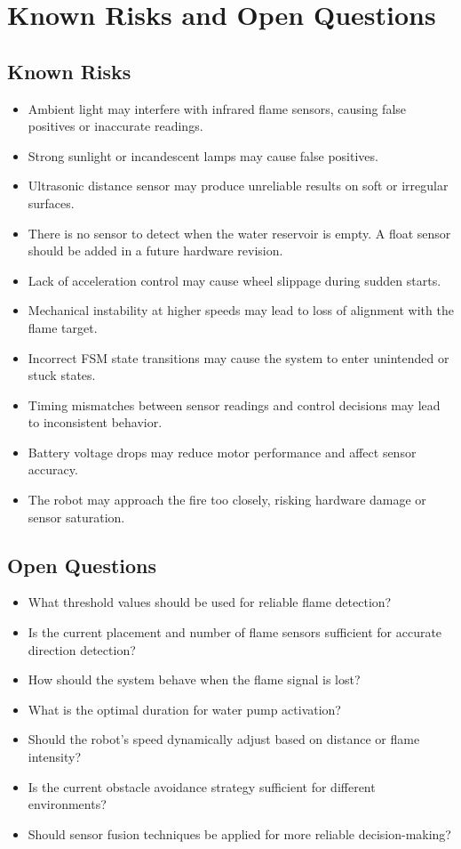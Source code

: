 \documentclass[12pt]{article}
\begin{document}
\section{Known Risks and Open Questions}

\subsection{Known Risks}
\begin{itemize}
    \item Ambient light may interfere with infrared flame sensors, causing false positives or inaccurate readings.
    \item Strong sunlight or incandescent lamps may cause false positives.
    \item Ultrasonic distance sensor may produce unreliable results on soft or irregular surfaces.
    \item There is no sensor to detect when the water reservoir is empty. A float sensor should be added in a future hardware revision.
    \item Lack of acceleration control may cause wheel slippage during sudden starts.
    \item Mechanical instability at higher speeds may lead to loss of alignment with the flame target.
    \item Incorrect FSM state transitions may cause the system to enter unintended or stuck states.
    \item Timing mismatches between sensor readings and control decisions may lead to inconsistent behavior.
    \item Battery voltage drops may reduce motor performance and affect sensor accuracy.
    \item The robot may approach the fire too closely, risking hardware damage or sensor saturation.
\end{itemize}

\subsection{Open Questions}
\begin{itemize}
    \item What threshold values should be used for reliable flame detection?
    \item Is the current placement and number of flame sensors sufficient for accurate direction detection?
    \item How should the system behave when the flame signal is lost?
    \item What is the optimal duration for water pump activation?
    \item Should the robot’s speed dynamically adjust based on distance or flame intensity?
    \item Is the current obstacle avoidance strategy sufficient for different environments?
    \item Should sensor fusion techniques be applied for more reliable decision-making?
\end{itemize}
\end{document}
